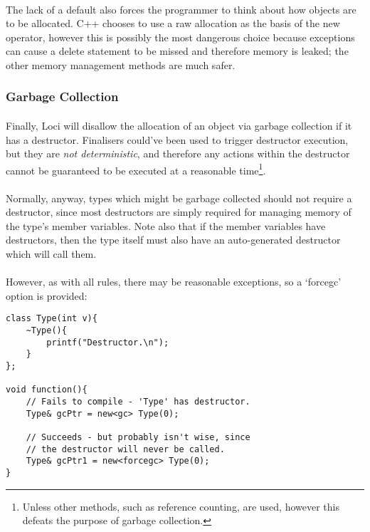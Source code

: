 \documentclass[12pt,twoside,notitlepage]{report}
\begin{document}
\paragraph{}
The lack of a default also forces the programmer to think about how objects are to be allocated. C++ chooses to use a raw allocation as the basis of the new operator, however this is possibly the most dangerous choice because exceptions can cause a delete statement to be missed and therefore memory is leaked; the other memory management methods are much safer.

\subsubsection{Garbage Collection}

\paragraph{}
Finally, Loci will disallow the allocation of an object via garbage collection if it has a destructor. Finalisers could've been used to trigger destructor execution, but they are \emph{not deterministic}, and therefore any actions within the destructor cannot be guaranteed to be executed at a reasonable time\footnote{Unless other methods, such as reference counting, are used, however this defeats the purpose of garbage collection.}.

\paragraph{}
Normally, anyway, types which might be garbage collected should not require a destructor, since most destructors are simply required for managing memory of the type's member variables. Note also that if the member variables have destructors, then the type itself must also have an auto-generated destructor which will call them.

\paragraph{}
However, as with all rules, there may be reasonable exceptions, so a `forcegc' option is provided:

\small{
\begin{verbatim}
class Type(int v){
    ~Type(){
        printf("Destructor.\n");
    }
};

void function(){
    // Fails to compile - 'Type' has destructor.
    Type& gcPtr = new<gc> Type(0);
    
    // Succeeds - but probably isn't wise, since 
    // the destructor will never be called.
    Type& gcPtr1 = new<forcegc> Type(0);
}
\end{verbatim}
}
\end{document}
